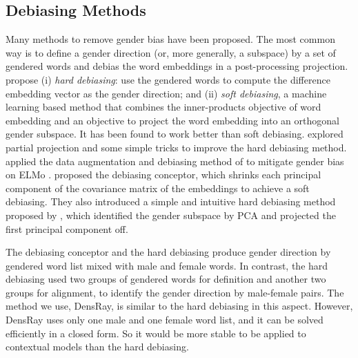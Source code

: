 \subsection{Debiasing Methods}
Many methods to remove gender bias have been proposed. The most common way is to define a gender direction (or, more generally, a subspace) by a set of gendered words and debias the word embeddings in a post-processing projection. \cite{bolukbasi2016man} propose (i) \emph{hard debiasing}: use the gendered words to compute the difference embedding vector as the gender direction; and (ii) \emph{soft debiasing}, a machine learning based method that combines the inner-products objective of word embedding and an objective to project the word embedding into an orthogonal gender subspace. It has been found to work better than soft debiasing.  \cite{dev2019attenuating} explored partial projection and some simple tricks to improve the hard debiasing method.
\cite{zhao2019gender} applied the data augmentation and debiasing method of  \cite{bolukbasi2016man} to mitigate gender bias on ELMo  \cite{Peters:2018}. \cite{karve2019conceptor} proposed the debiasing conceptor, which shrinks each principal component of the covariance matrix of the embeddings to achieve a soft debiasing. They also introduced a simple and intuitive hard debiasing method proposed by \cite{mu2018all}, which identified the gender subspace by PCA and projected the first principal component off.  

The debiasing conceptor and the \cite{mu2018all} hard debiasing produce gender direction by gendered word list mixed with male and female words. In contrast, the \cite{bolukbasi2016man} hard debiasing used two groups of gendered words for definition and another two groups for alignment, to identify the gender direction by male-female pairs. The method we use, DensRay, is similar to the \cite{bolukbasi2016man} hard debiasing in this aspect. However, DensRay uses only one male and one female word list, and it can be solved efficiently in a closed form. So it would be more stable to be applied to contextual models than the \cite{bolukbasi2016man} hard debiasing. 
 



